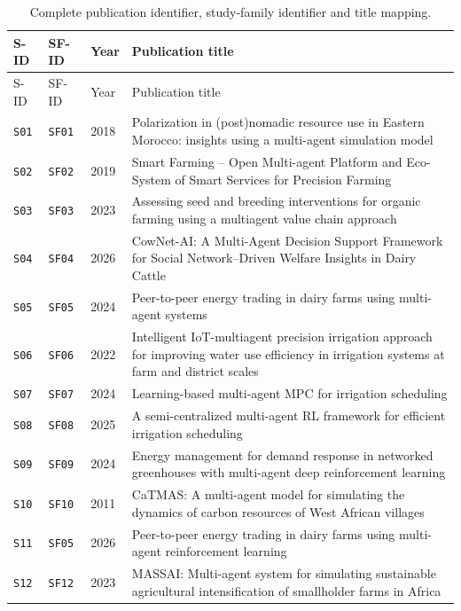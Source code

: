\begin{longtable}{@{}p{}p{}p{}p{}@{}}
\caption{Complete publication identifier, study-family identifier and title mapping.}\label{tab:app_family_mapping}\\
\toprule S-ID & SF-ID & Year & Publication title \\\midrule\endfirsthead
\toprule S-ID & SF-ID & Year & Publication title \\\midrule\endhead
\texttt{S01} & \texttt{SF01} & 2018 & Polarization in (post)nomadic resource use in Eastern Morocco: insights using a multi-agent simulation model\\
\texttt{S02} & \texttt{SF02} & 2019 & Smart Farming -- Open Multi-agent Platform and Eco-System of Smart Services for Precision Farming\\
\texttt{S03} & \texttt{SF03} & 2023 & Assessing seed and breeding interventions for organic farming using a multiagent value chain approach\\
\texttt{S04} & \texttt{SF04} & 2026 & CowNet-AI: A Multi-Agent Decision Support Framework for Social Network--Driven Welfare Insights in Dairy Cattle\\
\texttt{S05} & \texttt{SF05} & 2024 & Peer-to-peer energy trading in dairy farms using multi-agent systems\\
\texttt{S06} & \texttt{SF06} & 2022 & Intelligent IoT-multiagent precision irrigation approach for improving water use efficiency in irrigation systems at farm and district scales\\
\texttt{S07} & \texttt{SF07} & 2024 & Learning-based multi-agent MPC for irrigation scheduling\\
\texttt{S08} & \texttt{SF08} & 2025 & A semi-centralized multi-agent RL framework for efficient irrigation scheduling\\
\texttt{S09} & \texttt{SF09} & 2024 & Energy management for demand response in networked greenhouses with multi-agent deep reinforcement learning\\
\texttt{S10} & \texttt{SF10} & 2011 & CaTMAS: A multi-agent model for simulating the dynamics of carbon resources of West African villages\\
\texttt{S11} & \texttt{SF05} & 2026 & Peer-to-peer energy trading in dairy farms using multi-agent reinforcement learning\\
\texttt{S12} & \texttt{SF12} & 2023 & MASSAI: Multi-agent system for simulating sustainable agricultural intensification of smallholder farms in Africa\\

\end{longtable}
